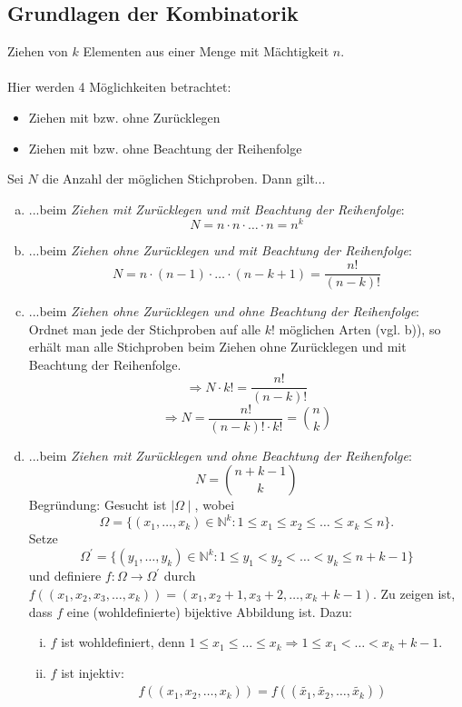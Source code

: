 \documentclass[a4paper,12pt,fleqn]{scrartcl}
\newcommand{\N}{\mathbb{N}}
\newcommand{\impl}{\Rightarrow}
\theoremstyle{definition}
\theoremstyle{plain}
\theoremstyle{remark}
\begin{document}
\subsection{Grundlagen der Kombinatorik}
Ziehen von $k$ Elementen aus einer Menge mit Mächtigkeit $n$.\\
\\
Hier werden 4 Möglichkeiten betrachtet:
\begin{itemize}
\item Ziehen mit bzw. ohne Zurücklegen
\item Ziehen mit bzw. ohne Beachtung der Reihenfolge
\end{itemize}
Sei $N$ die Anzahl der möglichen Stichproben. Dann gilt...
\begin{enumerate}[a)]
\item ...beim \emph{Ziehen mit Zurücklegen und mit Beachtung der Reihenfolge}:
\[N = n \cdot n \cdot \ldots \cdot n = n^{k}\]
\item ...beim \emph{Ziehen ohne Zurücklegen und mit Beachtung der Reihenfolge}:
\[N = n \cdot (n-1) \cdot \ldots \cdot (n-k+1) = \frac{n!}{(n-k)!}\]
\item ...beim \emph{Ziehen ohne Zurücklegen und ohne Beachtung der Reihenfolge}:\\
Ordnet man jede der Stichproben auf alle $k!$ möglichen Arten (vgl. b)), so erhält man alle Stichproben beim Ziehen ohne Zurücklegen und mit Beachtung der Reihenfolge.
\[\impl N \cdot k! = \frac{n!}{(n-k)!}\]
\[\impl N = \frac{n!}{(n-k)! \cdot k!} = \binom{n}{k}\]
\item ...beim \emph{Ziehen mit Zurücklegen und ohne Beachtung der Reihenfolge}:
\[N = \binom{n+k-1}{k}\]
Begründung: Gesucht ist $\mid \Omega \mid$, wobei 
\[\Omega=\{(x_1, \ldots, x_k) \in \N^{k}:1 \leq x_1 \leq x_2 \leq \ldots \leq x_k \leq n\}.\]
Setze \[\Omega^\prime=\{(y_1, \ldots, y_k) \in \N^{k}:1 \leq y_1 < y_2 < \ldots < y_k \leq n+k-1\}\] und definiere $f: \Omega \rightarrow \Omega^\prime$ durch $f((x_1, x_2, x_3, \ldots, x_k)) = (x_1, x_2+1, x_3+2, \ldots, x_k+k-1)$. Zu zeigen ist, dass $f$ eine (wohldefinierte) bijektive Abbildung ist. Dazu:
\begin{enumerate}[(i)]
\item $f$ ist wohldefiniert, denn $1 \leq x_1 \leq \ldots \leq x_k \impl 1 \leq x_1 < \ldots < x_k+k-1$.
\item $f$ ist injektiv:
\begin{align*}
&f((x_1, x_2, \ldots, x_k)) = f((\widetilde{x_1}, \widetilde{x_2}, \ldots, \widetilde{x_k})) \\

\end{align*}
\end{enumerate}
\end{enumerate}
\end{document}
